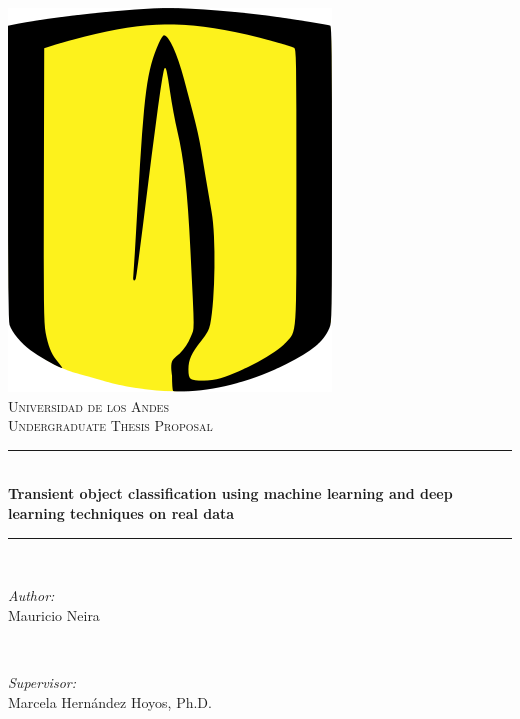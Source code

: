 \begin{titlepage}

\newcommand{\HRule}{\rule{\linewidth}{0.5mm}} %

\center %



 
\includegraphics[width=0.3\columnwidth]{University_of_Los_Andes_logo.png}\\[1cm] %
\textsc{\Large Universidad de los Andes}\\[1.5cm] %
\textsc{\large Undergraduate Thesis Proposal}\\[0.5cm] %


\HRule \\[0.4cm]
{ \Large \bfseries Transient object classification using machine learning and deep learning techniques on real data}\\[0.4cm] %
\HRule \\[1.5cm]
 

\begin{minipage}{0.4\textwidth}
\begin{flushleft} \large
\emph{Author:}\\
Mauricio Neira %
\end{flushleft}
\end{minipage}
~
\begin{minipage}{0.5\textwidth}
\begin{flushright} \large
\emph{Supervisor:} \\
Marcela Hernández Hoyos, Ph.D. %
\end{flushright}
\end{minipage}\\[2cm]


\end{titlepage}
